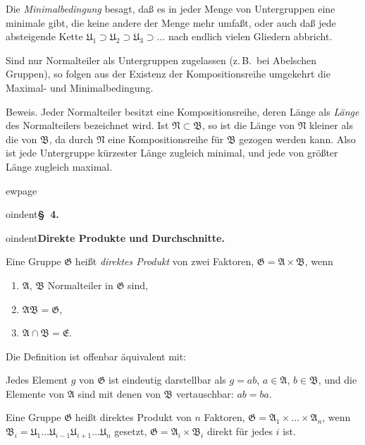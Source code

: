\documentclass[12pt,a4paper]{article}
\newcommand{\dprod}{\times}             %
\theoremstyle{definition}
\begin{document}
Die \textit{Minimalbedingung} besagt, da\ss{} es in jeder Menge von
Untergruppen eine minimale gibt, die keine andere der Menge mehr
umfa\ss t, oder auch da\ss{} jede absteigende Kette
$\mathfrak{U}_1 \supset \mathfrak{U}_2 \supset \mathfrak{U}_3 \supset \dots$
nach endlich vielen Gliedern abbricht.

Sind nur Normalteiler als Untergruppen zugelassen (z.\,B.\ bei
Abelschen Gruppen), so folgen aus der Existenz der Kompositionsreihe
umgekehrt die Maximal- und Minimalbedingung.

Beweis. Jeder Normalteiler besitzt eine Kompositionsreihe, deren L\"ange
als \textit{L\"ange} des Normalteilers bezeichnet wird. Ist
$\mathfrak{N} \subset \mathfrak{B}$, so ist die L\"ange von
$\mathfrak{N}$ kleiner als die von $\mathfrak{B}$, da durch
$\mathfrak{N}$ eine Kompositionsreihe f\"ur $\mathfrak{B}$ gezogen
werden kann. Also ist jede Untergruppe k\"urzester L\"ange zugleich
minimal, und jede von gr\"o\ss ter L\"ange zugleich maximal.



ewpage
\setcounter{page}{587}



oindent\textbf{\S~4.}



oindent\textbf{Direkte Produkte und Durchschnitte.}

Eine Gruppe $\mathfrak{G}$ hei\ss t \textit{direktes Produkt} von zwei
Faktoren, $\mathfrak{G} = \mathfrak{A} \dprod \mathfrak{B}$, wenn
\begin{enumerate}[label=\arabic*.]
  \item $\mathfrak{A}$, $\mathfrak{B}$ Normalteiler in $\mathfrak{G}$ sind,
  \item $\mathfrak{A} \mathfrak{B} = \mathfrak{G}$,
  \item $\mathfrak{A} \cap \mathfrak{B} = \mathfrak{E}$.
\end{enumerate}
Die Definition ist offenbar \"aquivalent mit:

Jedes Element $g$ von $\mathfrak{G}$ ist eindeutig darstellbar als
$g = ab$, $a \in \mathfrak{A}$, $b \in \mathfrak{B}$, und die Elemente von
$\mathfrak{A}$ sind mit denen von $\mathfrak{B}$ vertauschbar: $ab = ba$.

Eine Gruppe $\mathfrak{G}$ hei\ss t direktes Produkt von $n$ Faktoren,
$\mathfrak{G} = \mathfrak{A}_1 \dprod \dots \dprod \mathfrak{A}_n$, wenn
$\mathfrak{B}_i = \mathfrak{U}_1 \dots \mathfrak{U}_{i-1}
\mathfrak{U}_{i+1} \dots \mathfrak{U}_n$ gesetzt,
$\mathfrak{G} = \mathfrak{A}_i \dprod \mathfrak{B}_i$ direkt f\"ur jedes
$i$ ist.
\end{document}
